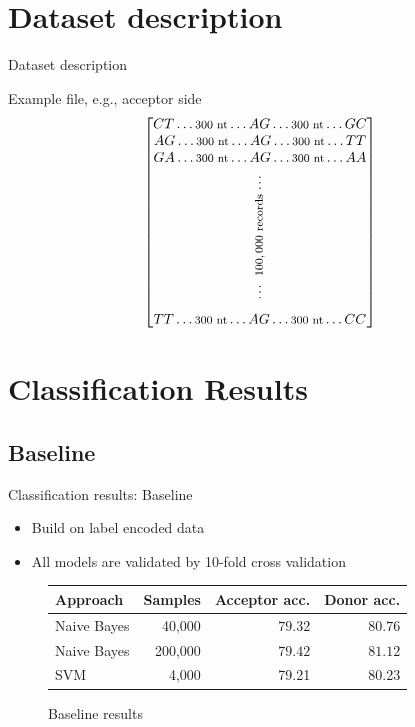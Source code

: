\documentclass[10pt]{beamer}
\begin{document}
\section{Dataset description}
\begin{frame}{Dataset description}
	
	\large Example file, e.g., acceptor side
	\begin{align*}
		\begin{bmatrix}
		CT \dots \rotatebox{0}{\footnotesize $ 300 $ nt} \dots AG \dots \rotatebox{0}{\footnotesize $ 300 $ nt} \dots GC\\
		AG \dots \rotatebox{0}{\footnotesize $ 300 $ nt} \dots AG \dots \rotatebox{0}{\footnotesize $ 300 $ nt} \dots TT \\
		GA \dots \rotatebox{0}{\footnotesize $ 300 $ nt} \dots AG \dots \rotatebox{0}{\footnotesize $ 300 $ nt} \dots AA \\[0.2ex]
		\vdots\\
		\rotatebox{90}{\footnotesize$ ~100,000 $ records} \\[-1.3ex]
		\vdots \\[1.4ex]
		TT \dots \rotatebox{0}{\footnotesize $ 300 $ nt} \dots AG \dots \rotatebox{0}{\footnotesize $ 300 $ nt} \dots CC
		\end{bmatrix}
	\end{align*}
\end{frame}

\section{Classification Results}
\subsection{Baseline}
\begin{frame}{Classification results: Baseline}
	\large
	\begin{itemize}
		\item Build on label encoded data
		\item All models are validated by 10-fold cross validation
	\end{itemize}
	\begin{figure}
		\centering
		\begingroup
		\def\arraystretch{1.5}
		\begin{tabular}{|l|r|r|r|}
			\hline
			Approach & Samples & Acceptor acc. & Donor acc. \\
			\hline
			Naive Bayes & 40,000 & $79.32$ & $80.76$ \\
			Naive Bayes & 200,000 & $79.42$ & $81.12$ \\
			\hline
			SVM & 4,000 & 79.21 & 80.23\\
			\hline  
		\end{tabular}
		\endgroup
		\caption{Baseline results}
	\end{figure}	
\end{frame}
\end{document}
